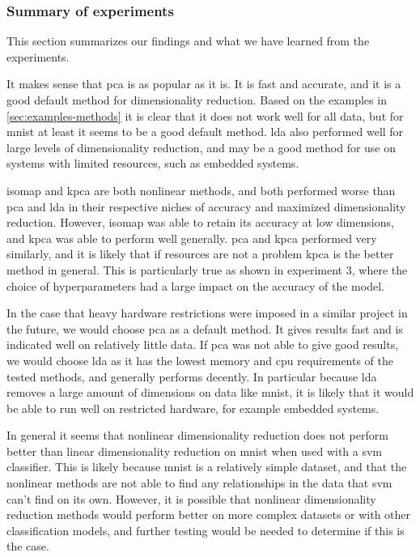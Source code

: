 \subsubsection{Summary of experiments}\label{subsec:summary-of-experiments}
This section summarizes our findings and what we have learned from the experiments.

It makes sense that \gls{pca} is as popular as it is. It is fast and accurate, and it is a good default method for dimensionality reduction. Based on the examples in \autoref{sec:examples-methods} it is clear that it does not work well for all data, but for \gls{mnist} at least it seems to be a good default method. \gls{lda} also performed well for large levels of dimensionality reduction, and may be a good method for use on systems with limited resources, such as embedded systems.

\gls{isomap} and \gls{kpca} are both nonlinear methods, and both performed worse than \gls{pca} and \gls{lda} in their respective niches of accuracy and maximized dimensionality reduction. However, \gls{isomap} was able to retain its accuracy at low dimensions, and \gls{kpca} was able to perform well generally. \gls{pca} and \gls{kpca} performed very similarly, and it is likely that if resources are not a problem \gls{kpca} is the better method in general. This is particularly true as shown in experiment 3, where the choice of hyperparameters had a large impact on the accuracy of the model.

In the case that heavy hardware restrictions were imposed in a similar project in the future, we would choose \gls{pca} as a default method. It gives results fast and is indicated well on relatively little data. If \gls{pca} was not able to give good results, we would choose \gls{lda} as it has the lowest memory and cpu requirements of the tested methods, and generally performs decently. In particular because \gls{lda} removes a large amount of dimensions on data like \gls{mnist}, it is likely that it would be able to run well on restricted hardware, for example embedded systems.

In general it seems that nonlinear dimensionality reduction does not perform better than linear dimensionality reduction on \gls{mnist} when used with a \gls{svm} classifier. This is likely because \gls{mnist} is a relatively simple dataset, and that the nonlinear methods are not able to find any relationships in the data that \gls{svm} can't find on its own. However, it is possible that nonlinear dimensionality reduction methods would perform better on more complex datasets or with other classification models, and further testing would be needed to determine if this is the case.